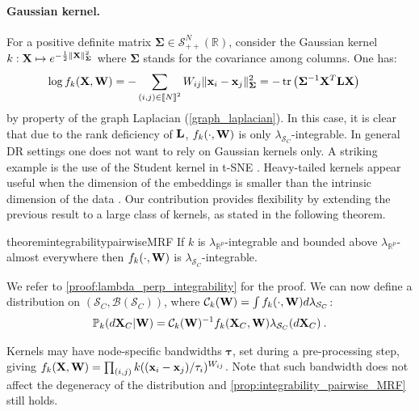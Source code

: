 \paragraph{Gaussian kernel.} For a positive definite matrix $\mathbf{\Sigma} \in \mathcal{S}^N_{++}(\mathbb{R})$, consider the Gaussian kernel $k : \mathbf{X} \mapsto e^{- \frac{1}{2}\| \mathbf{X} \|_{\mathbf{\Sigma}}^2}$ where $\mathbf{\Sigma}$ stands for the covariance among columns. One has:
\begin{align}\label{eq:gaussian_kernel}
    \log f_{k}(\mathbf{X}, {\mathbf{W}}) &= -\sum_{(i,j) \in {[\![N]\!]}^2} W_{ij} \| \mathbf{x}_{i}-\mathbf{x}_{j} \|^2_{\mathbf{\Sigma}}
    = - \operatorname{tr} \left(\mathbf{\Sigma}^{-1} \mathbf{X}^{T} \mathbf{L} \mathbf{X}\right)
\end{align}
by property of the graph Laplacian (\cref{graph_laplacian}). In this case, it is clear that due to the rank deficiency of $\mathbf{L}$, $f_{k}(\cdot, {\mathbf{W}})$ is only $\lambda_{\mathcal{S}_{C}}$-integrable. In general DR settings one does not want to rely on Gaussian kernels only. A striking example is the use of the Student kernel in t-SNE \citep{maaten2008tSNE}. Heavy-tailed kernels appear useful when the dimension of the embeddings is smaller than the intrinsic dimension of the data \citep{kobak2019heavy}. Our contribution provides flexibility by extending the previous result to a large class of kernels, as stated in the following theorem.

\begin{restatable}{theorem}{integrabilitypairwiseMRF}
\label{prop:integrability_pairwise_MRF}
If $k$ is $\lambda_{\mathbb{R}^p}$-integrable and bounded above $\lambda_{\mathbb{R}^p}$-almost everywhere then $f_{k}(\cdot, {\mathbf{W}})$ is $\lambda_{\mathcal{S}_{C}}$-integrable.
\end{restatable}

We refer to \cref{proof:lambda_perp_integrability} for the proof.
We can now define a distribution on $(\mathcal{S}_{C}, \mathcal{B}(\mathcal{S}_{C}))$, where $\mathcal{C}_{k}({\mathbf{W}}) = \int f_{k}(\cdot, {\mathbf{W}}) d\lambda_{\mathcal{S}_{C}}$:
\begin{align}\label{eq:proba_perp}
\mathbb{P}_{k}(d\mathbf{X}_{C} | {\mathbf{W}}) = \mathcal{C}_{k}({\mathbf{W}})^{-1} f_{k}(\mathbf{X}_{C}, {\mathbf{W}}) \lambda_{\mathcal{S}_{C}}(d\mathbf{X}_{C}) \: .
\end{align}

\begin{remark}
Kernels may have node-specific bandwidths $\bm{\tau}$, set during a pre-processing step, giving $f_{k}(\mathbf{X},{\mathbf{W}}) = \prod_{(i,j)} k((\mathbf{x}_{i} - \mathbf{x}_{j})/\tau_{i})^{W_{ij}}$. Note that such bandwidth does not affect the degeneracy of the distribution and \cref{prop:integrability_pairwise_MRF} still holds.
\end{remark}


